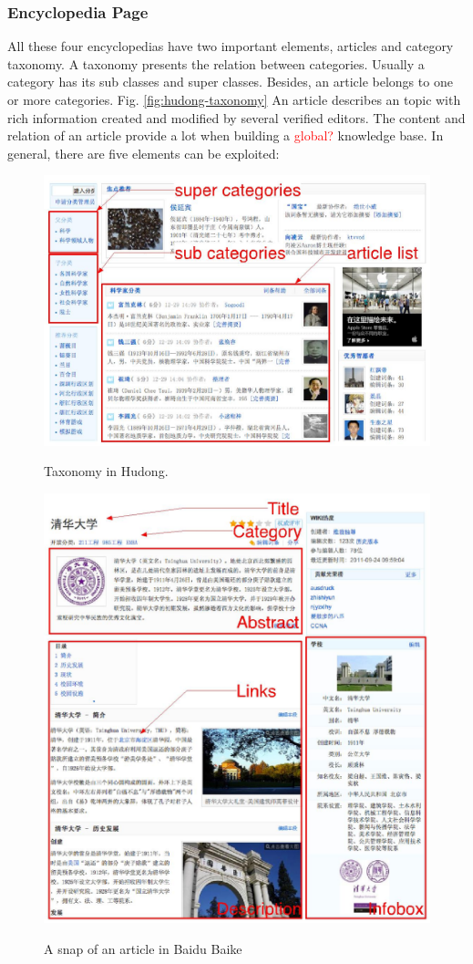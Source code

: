 \documentclass[runningheads,a4paper]{llncs}
\begin{document}
\subsubsection{Encyclopedia Page}
All these four encyclopedias have two important elements, articles and category taxonomy. A taxonomy presents the relation between categories. Usually a category has its sub classes and super classes. Besides, an article belongs to one or more categories. Fig. \ref{fig:hudong-taxonomy} An article describes an topic with rich information created and modified by several verified editors. The content and relation of an article provide a lot when building a \textcolor{red}{global?} knowledge base. In general, there are five elements can be exploited:
\begin{figure}
    \centering
    \begin{minipage}[t]{0.5\textwidth}
        \centerline{\includegraphics[width=0.8\columnwidth]{fig/hudong-taxonomy}}
        \label{fig:hudong-taxonomy}
        \caption{Taxonomy in Hudong.}
    \end{minipage}%
    \begin{minipage}[t]{0.5\textwidth}
        \centerline{\includegraphics[width=0.8\columnwidth]{fig/baidu-article}}
        \label{fig:baidu-article}
        \caption{A snap of an article in Baidu Baike}
    \end{minipage}%
\end{figure}
\end{document}
